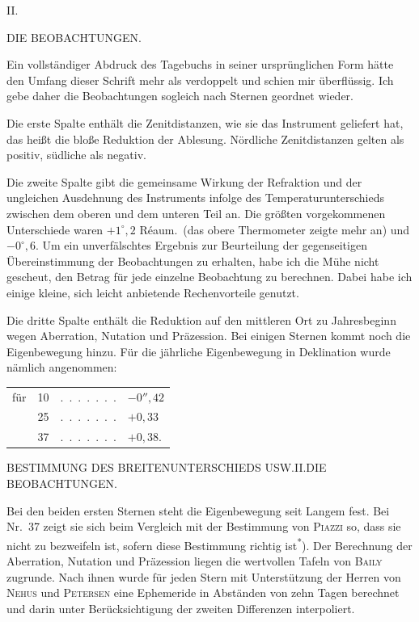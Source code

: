 \clearpage
\vspace*{18mm}
\begin{center}
{\large II.}\par\medskip
{\Large DIE BEOBACHTUNGEN.}
\end{center}

Ein vollständiger Abdruck des Tagebuchs in seiner ursprünglichen Form hätte den Umfang
dieser Schrift mehr als verdoppelt und schien mir überflüssig. Ich gebe daher die
Beobachtungen sogleich nach Sternen geordnet wieder.

Die erste Spalte enthält die Zenitdistanzen, wie sie das Instrument geliefert hat,
das heißt die bloße Reduktion der Ablesung. Nördliche Zenitdistanzen gelten als positiv,
südliche als negativ.

Die zweite Spalte gibt die gemeinsame Wirkung der Refraktion und der ungleichen Ausdehnung
des Instruments infolge des Temperaturunterschieds zwischen dem oberen und dem unteren Teil
an. Die größten vorgekommenen Unterschiede waren $+1^\circ{,}2$ Réaum.\ (das obere
Thermometer zeigte mehr an) und $-0^\circ{,}6$. Um ein unverfälschtes Ergebnis zur
Beurteilung der gegenseitigen Übereinstimmung der Beobachtungen zu erhalten, habe ich die
Mühe nicht gescheut, den Betrag für jede einzelne Beobachtung zu berechnen. Dabei habe ich
einige kleine, sich leicht anbietende Rechenvorteile genutzt.

Die dritte Spalte enthält die Reduktion auf den mittleren Ort zu Jahresbeginn wegen
Aberration, Nutation und Präzession. Bei einigen Sternen kommt noch die Eigenbewegung hinzu.
Für die jährliche Eigenbewegung in Deklination wurde nämlich angenommen:
\begin{center}
\begin{tabular}{@{}lr@{\quad}c@{\quad}l@{}}
für&10&.\ .\ .\ .\ .\ .\ .&$-0''{,}42$\\
&25&.\ .\ .\ .\ .\ .\ .&$+0{,}33$\\
&37&.\ .\ .\ .\ .\ .\ .&$+0{,}38$.
\end{tabular}
\end{center}

\clearpage
\noindent\parbox[t]{\dimexpr\textwidth-10mm\relax}{\centering\scriptsize BESTIMMUNG DES BREITENUNTERSCHIEDS USW.\quad II.\quad DIE BEOBACHTUNGEN.}\par
\noindent Bei den beiden ersten Sternen steht die Eigenbewegung seit Langem fest. Bei Nr.\ 37
zeigt sie sich beim Vergleich mit der Bestimmung von \textsc{Piazzi} so, dass sie nicht zu
bezweifeln ist, sofern diese Bestimmung richtig ist\textsuperscript{*}). Der Berechnung
der Aberration, Nutation und Präzession liegen die wertvollen Tafeln von \textsc{Baily}
zugrunde. Nach ihnen wurde für jeden Stern mit Unterstützung der Herren von
\textsc{Nehus} und \textsc{Petersen} eine Ephemeride in Abständen von zehn Tagen berechnet
und darin unter Berücksichtigung der zweiten Differenzen interpoliert.

